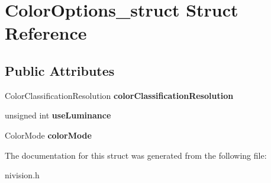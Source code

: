 \hypertarget{structColorOptions__struct}{
\section{ColorOptions\_\-struct Struct Reference}
\label{structColorOptions__struct}
}
\subsection*{Public Attributes}
\begin{DoxyCompactItemize}
\item 
\hypertarget{structColorOptions__struct_aaaa8d60738aa6f7c210e9ff47fcc91a5}{
ColorClassificationResolution {\bfseries colorClassificationResolution}}
\label{structColorOptions__struct_aaaa8d60738aa6f7c210e9ff47fcc91a5}

\item 
\hypertarget{structColorOptions__struct_ab8894f9cc96a9a052110cde7e172fc08}{
unsigned int {\bfseries useLuminance}}
\label{structColorOptions__struct_ab8894f9cc96a9a052110cde7e172fc08}

\item 
\hypertarget{structColorOptions__struct_a17e73c526b7511138181355ca76dbbda}{
ColorMode {\bfseries colorMode}}
\label{structColorOptions__struct_a17e73c526b7511138181355ca76dbbda}

\end{DoxyCompactItemize}


The documentation for this struct was generated from the following file:\begin{DoxyCompactItemize}
\item 
nivision.h\end{DoxyCompactItemize}
